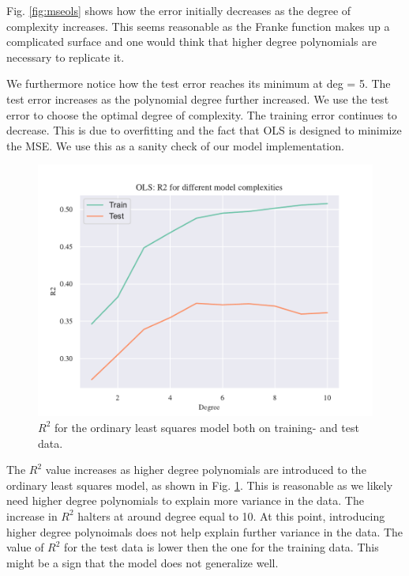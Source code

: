 Fig. \ref{fig:mseols} shows how the error initially decreases as the degree of complexity increases. This seems reasonable as the Franke function makes up a complicated surface and one would think that higher degree polynomials are necessary to replicate it. 

We furthermore notice how the test error reaches its minimum at deg = 5. The test error increases as the polynomial degree further increased. We use the test error to choose the optimal degree of complexity. The training error continues to decrease. This is due to overfitting and the fact that OLS is designed to minimize the MSE. We use this as a sanity check of our model implementation.

\begin{figure}[h!]
    \centering
    \includegraphics[width=1\linewidth]{project_1_alt/figures/figures_in_report/OLS_R2_Franke_Noise.pdf}
    \caption{$R^2$ for the ordinary least squares model both on training- and test data.}
    \label{fig:r2ols}
\end{figure}

The $R^2$ value increases as higher degree polynomials are introduced to the ordinary least squares model, as shown in Fig. \ref{fig:r2ols}. This is reasonable as we likely need higher degree polynomials to explain more variance in the data. The increase in $R^2$ halters at around degree equal to 10. At this point, introducing higher degree polynoimals does not help explain further variance in the data. The value of $R^2$ for the test data is lower then the one for the training data. This might be a sign that the model does not generalize well. 

